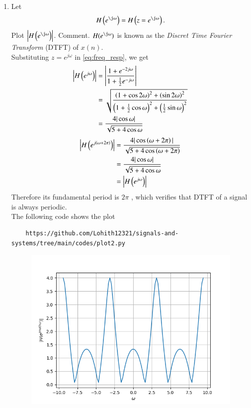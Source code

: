 \documentclass[journal,12pt,twocolumn]{IEEEtran}
\theoremstyle{remark}
\begin{document}
\begin{enumerate}[label=\thesection.\arabic*
,ref=\thesection.\theenumi]
\begin{enumerate}[label=\thesection.\arabic*
,ref=\thesection.\theenumi]
\item Let 
\begin{equation}
H\brak{e^{\j \omega}} = H\brak{z = e^{\j \omega}}.
\end{equation}
Plot $\abs{H\brak{e^{\j \omega}}}$.  Comment.  $H(e^{\j \omega})$ is
known as the {\em Discret Time Fourier Transform} (DTFT) of $x(n)$.\\
\solution 
Substituting $z = e^{j \omega}$ in \eqref{eq:freq_resp}, we get
\begin{align}
	\left|H\left(e^{j\omega}\right)\right| &= \left|\frac{1 + e^{-2j\omega}}{1 + \frac{1}{2}e^{-j\omega}}\right| \\
									  &= \sqrt{\frac{\left(1 + \cos{2\omega}\right)^2 + \left(\sin{2\omega}\right)^2}{\left(1 + \frac{1}{2}\cos{\omega}\right)^2 + \left(\frac{1}{2}\sin{\omega}\right)^2}}\\
									  &= \frac{4|\cos{\omega}|}{\sqrt{5 + 4\cos{\omega}}}
\end{align}
\begin{align}
	\left|H\left(e^{j\left(\omega + 2\pi\right)}\right)\right| &= \frac{4|\cos\left(\omega + 2\pi\right)|}{\sqrt{5 + 4\cos\left(\omega + 2\pi\right)}} \\
											   &= \frac{4|\cos{\omega}|}{\sqrt{5 + 4\cos{\omega}}} \\
											   &= \left|H\left(e^{j\omega}\right)\right|	
\end{align}
Therefore its fundamental period is $2\pi$ , which verifies that DTFT of a signal is always periodic.\\
The following code shows the plot
\begin{lstlisting}
    https://github.com/Lohith12321/signals-and-systems/tree/main/codes/plot2.py
\end{lstlisting}
\begin{figure}[ht]
    \centering  
\includegraphics[width=\columnwidth]{figs/plot2.png}


\end{figure}
\end{enumerate}
\end{enumerate}
\end{document}
